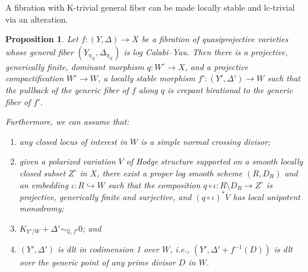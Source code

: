 \documentclass{amsart}
\newtheorem{prop}[theorem]{Proposition}
\theoremstyle{definition}
\theoremstyle{remark}
\def\bQ{\mathbb{Q}}
\numberwithin{equation}{section}
\begin{document}
A fibration with K-trivial general fiber can be made locally stable and lc-trivial via an alteration.

\begin{prop}\label{lem:alteration}
Let $f\colon (Y, \Delta) \to X$ be a fibration of quasiprojective varieties
whose general fiber
$(Y_{\eta_X}, \Delta_{\eta_X})$ is log Calabi--Yau. Then there is a projective, generically finite, dominant morphism $q \colon W^{\circ} \to X$, and a projective compactification $W^{\circ} \to W$, a locally stable morphism $f' \colon (Y', \Delta') \to W$ such that the pullback of the generic fiber of $f$ along $q$ is crepant birational to the generic fiber of $f'$.

Furthermore, we can assume that:
\begin{enumerate}

\item any closed locus of interest in $W$ is a simple normal crossing divisor;

\item given a polarized variation $V$ of Hodge structure supported on a smooth locally closed subset $Z^{\circ}$ in $X$, there exist a proper log smooth scheme $(R, D_{R})$ and an embedding $\iota \colon R \hookrightarrow W$ such that the composition $q \circ \iota \colon R \setminus D_{R} \to Z^{\circ}$ is projective, generically finite and surjective, and $(q \circ \iota)^*V$ has local unipotent monodromy;

\item 
$K_{Y'/W} + \Delta' \sim_{\bQ, f'} 0$; and

\item $(Y', \Delta')$ is dlt in codimension 1 over $W$, i.e., $(Y', \Delta' + f^{-1}(D))$ is dlt
over the generic point of any prime divisor $D$ in $W$.

\end{enumerate}
\end{prop}
\end{document}
